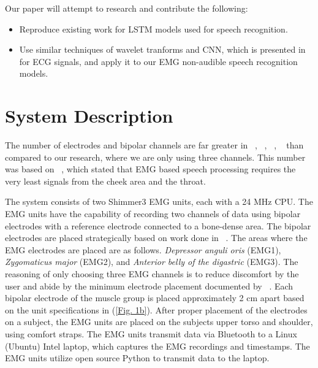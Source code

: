 \documentclass[conference]{IEEEtran}
\begin{document}
Our paper will attempt to research and contribute the following:
\begin{itemize}
  \item Reproduce existing work for LSTM models used for speech recognition. 
  \item Use similar techniques of wavelet tranforms and CNN, which is presented in\cite{noauthor_classify_nodate} for ECG signals, and apply it to our EMG non-audible speech recognition models. 
\end{itemize}

\section{System Description}
The number of electrodes and bipolar channels are far greater in ~\cite{kapur_alterego:_2018}, ~\cite{wand_pattern_2014}, ~\cite{janke_emg--speech:_2017}, ~\cite{maier-hein_session_2005} than compared to our research, where we are only using three channels. This number was based on ~\cite{maier-hein_session_2005}, which stated that EMG based speech processing requires the very least signals from the cheek area and the throat. 

The system consists of two Shimmer3 EMG units, each with a 24 MHz CPU. The EMG units have the capability of recording two channels of data using  bipolar electrodes with a reference electrode connected to a bone-dense area. The bipolar electrodes are placed strategically based on work done in ~\cite{lopez-larraz_syllable-based_2010}. The areas where the EMG electrodes are placed are as follows. \textit{Depressor anguli oris} (EMG1), \textit{Zygomaticus major} (EMG2), and \textit{Anterior belly of the digastric} (EMG3). The reasoning of only choosing three EMG channels is to reduce discomfort by the user and abide by the minimum electrode placement documented by ~\cite{maier-hein_session_2005}. Each bipolar electrode of the muscle group is placed approximately 2 cm apart based on the unit specifications in (\figurename \ref{Fig. 1b}). After proper placement of the electrodes on a subject, the EMG units are placed on the subjects upper torso and shoulder, using comfort straps. The EMG units transmit data via Bluetooth to a Linux (Ubuntu) Intel laptop, which captures the EMG recordings and timestamps. The EMG units utilize open source Python to transmit data to the laptop.
\end{document}
